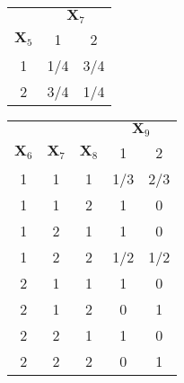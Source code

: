 \documentclass[11pt,fancychapters]{article}
\begin{document}
\centering
\begin{tabular}{| c | c c |} 
	\hline
    & \multicolumn{2}{c|}{$\mathbf{X}_7$} \\
	$\mathbf{X}_5$  & 1 & 2 \\ \hline
	1 & 1/4 & 3/4 \\
	2 & 3/4 & 1/4 \\
	\hline
\end{tabular}
\quad
\begin{tabular}{| c c c | c c |} 
	\hline
	& & & \multicolumn{2}{c|}{$\mathbf{X}_9$} \\
	$\mathbf{X}_6$ & $\mathbf{X}_7$ & $\mathbf{X}_8$ & 1 & 2 \\ \hline
	1 & 1 & 1 & 1/3 & 2/3 \\
	1 & 1 & 2 & 1 & 0 \\
	1 & 2 & 1 & 1 & 0 \\
	1 & 2 & 2 & 1/2 & 1/2 \\
	2 & 1 & 1 & 1 & 0 \\
	2 & 1 & 2 & 0 & 1 \\
	2 & 2 & 1 & 1 & 0 \\
	2 & 2 & 2 & 0 & 1 \\
	\hline
\end{tabular}
\end{document}
